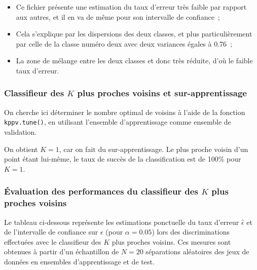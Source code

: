 \documentclass[a4paper,10pt]{report}
\begin{document}
\begin{itemize}
\begin{itemize}
		\begin{itemize}
			\item Ce fichier présente une estimation du taux d'erreur très faible par rapport aux autres, et il en va de même pour son intervalle de confiance~;
			\item Cela s'explique par les dispersions des deux classes, et plus particulièrement par celle de la classe numéro deux avec deux variances égales à 0.76~;
			\item La zone de mélange entre les deux classes et donc très réduite, d'où le faible taux d'erreur.
		\end{itemize}
	\end{itemize}
\end{itemize}





\subsubsection{Classifieur des $K$ plus proches voisins et sur-apprentissage}

On cherche ici déterminer le nombre optimal de voisins à l’aide de la fonction \texttt{kppv.tune()}, en utilisant l’ensemble d’apprentissage comme ensemble de validation.

On obtient $K = 1$, car on fait du sur-apprentissage. Le plus proche voisin d'un point étant lui-même, le taux de succès de la classification est de 100\% pour $K=1$.

\subsubsection{Évaluation des performances du classifieur des $K$ plus proches voisins}

Le tableau ci-dessous représente les estimations ponctuelle du taux d'erreur $\hat{\epsilon}$ et de l'intervalle de confiance sur $\epsilon$ (pour $\alpha = 0.05$) lors des discriminations effectuées avec le classifieur des $K$ plus proches voisins. Ces mesures sont obtenues à partir d'un échantillon de $N = 20$ séparations aléatoires des jeux de données en ensembles d'apprentissage et de test.
\end{document}
